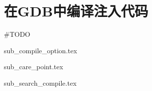 \section{在GDB中编译注入代码}

\#TODO

{sub_compile_option.tex}

{sub_care_point.tex}

{sub_search_compile.tex}
